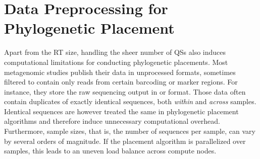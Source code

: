 
\section{Data Preprocessing for Phylogenetic Placement}
\label{ch:AutomaticTrees:sec:DataPreprocessing}

Apart from the \ac{RT} size, handling the sheer number of \acp{QS}
also induces computational limitations for conducting phylogenetic placements.
Most metagenomic studies publish their data in unprocessed formats,
sometimes filtered to contain only reads from certain barcoding or marker regions.
For instance, they store the raw sequencing output in  \citep{Pearson1988} or  \citep{Cock2009} format.
Those data often contain duplicates of exactly identical sequences, both {\em within} and {\em across} samples.
Identical sequences are however treated the same in phylogenetic placement algorithms
and therefore induce unnecessary computational overhead.
Furthermore, sample sizes, that is, the number of sequences per sample, can vary by several orders of magnitude.
If the placement algorithm is parallelized over samples, this leads to an uneven load balance across compute nodes.

